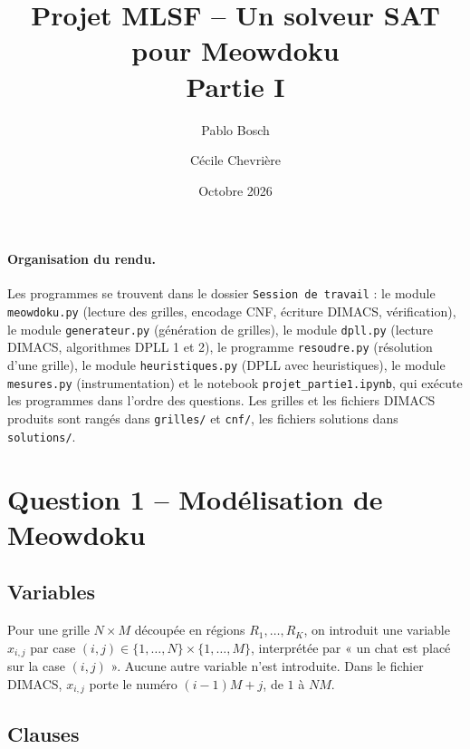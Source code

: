 \documentclass[11pt,a4paper]{article}
\title{Projet MLSF -- Un solveur SAT pour Meowdoku\\ \large Partie I}
\author{Pablo Bosch \and Cécile Chevrière}
\date{Octobre 2026}
\newcommand{\x}[2]{x_{#1,#2}}
\begin{document}
\maketitle

\paragraph{Organisation du rendu.} Les programmes se trouvent dans le dossier
\texttt{Session de travail} : le module \texttt{meowdoku.py} (lecture des grilles, encodage CNF,
écriture DIMACS, vérification), le module \texttt{generateur.py} (génération de grilles), le module
\texttt{dpll.py} (lecture DIMACS, algorithmes DPLL 1 et 2), le programme \texttt{resoudre.py}
(résolution d'une grille), le module \texttt{heuristiques.py} (DPLL avec heuristiques), le
module \texttt{mesures.py} (instrumentation) et le
notebook \texttt{projet\_partie1.ipynb}, qui exécute les programmes dans l'ordre des questions.
Les grilles et les fichiers DIMACS produits sont rangés dans \texttt{grilles/} et \texttt{cnf/},
les fichiers solutions dans \texttt{solutions/}.

\section{Question 1 -- Modélisation de Meowdoku}

\subsection{Variables}

Pour une grille $N\times M$ découpée en régions $R_1,\dots,R_K$, on introduit une variable
$\x ij$ par case $(i,j)\in\{1,\dots,N\}\times\{1,\dots,M\}$, interprétée par
« un chat est placé sur la case $(i,j)$ ». Aucune autre variable n'est introduite.
Dans le fichier DIMACS, $\x ij$ porte le numéro $(i-1)M+j$, de $1$ à $NM$.

\subsection{Clauses}
\end{document}
